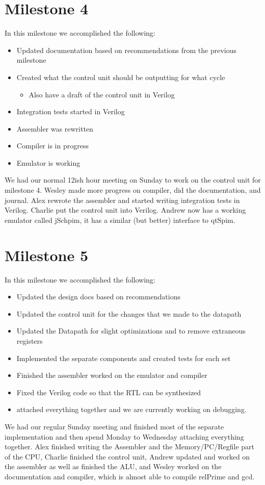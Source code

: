 \documentclass{report}
\begin{document}
	\section{Milestone 4}
		In this milestone we accomplished the following:
		\begin{itemize}
			\item Updated documentation based on recommendations from the previous milestone
			\item Created what the control unit should be outputting for what cycle
			\begin{itemize}
				\item Also have a draft of the control unit in Verilog
			\end{itemize}
			\item Integration tests started in Verilog
			\item Assembler was rewritten
			\item Compiler is in progress
			\item Emulator is working
		\end{itemize}
		We had our normal 12ish hour meeting on Sunday to work on the control unit for milestone 4.  Wesley made more progress on compiler, did the documentation, and journal.  Alex rewrote the assembler and started writing integration tests in Verilog.  Charlie put the control unit into Verilog. Andrew now has a working emulator called jSchpim, it has a similar (but better) interface to qtSpim.
	\section{Milestone 5}
		In this milestone we accomplished the following:
		\begin{itemize}
			\item Updated the design docs based on recommendations
			\item Updated the control unit for the changes that we made to the datapath
			\item Updated the Datapath for slight optimizations and to remove extraneous registers
			\item Implemented the separate components and created tests for each set
			\item Finished the assembler worked on the emulator and compiler
			\item Fixed the Verilog code so that the RTL can be synthesized
			\item attached everything together and we are currently working on debugging.
		\end{itemize}
		We had our regular Sunday meeting and finished most of the separate implementation and then spend Monday to Wednesday attaching everything together. Alex finished writing the Assembler and the Memory/PC/Regfile part of the CPU, Charlie finished the control unit, Andrew updated and worked on the assembler as well as finished the ALU, and Wesley worked on the documentation and compiler, which is almost able to compile relPrime and gcd.
\end{document}
